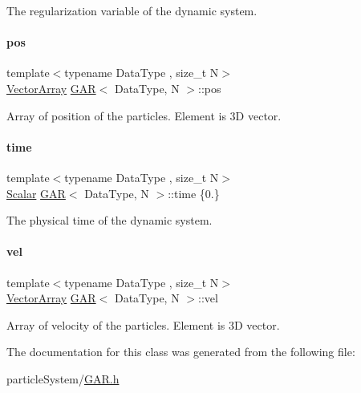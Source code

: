 The regularization variable of the dynamic system. 

\mbox{\label{class_g_a_r_aec6b3fdb2c4dd7bdae27c0b41fbf6dda}} 
\paragraph{\texorpdfstring{pos}{pos}}
{\footnotesize\ttfamily template$<$typename Data\+Type , size\+\_\+t N$>$ \\
\mbox{\hyperlink{class_g_a_r_a5818e17eb203504af6e10f38fc38d378}{Vector\+Array}} \mbox{\hyperlink{class_g_a_r}{G\+AR}}$<$ Data\+Type, N $>$\+::pos}



Array of position of the particles. Element is 3D vector. 

\mbox{\label{class_g_a_r_afaec5fb6242a3e5ae5cd368832cd1bb8}} 
\paragraph{\texorpdfstring{time}{time}}
{\footnotesize\ttfamily template$<$typename Data\+Type , size\+\_\+t N$>$ \\
\mbox{\hyperlink{class_g_a_r_a2ae44eda8e28d5dd26cf707dcda69314}{Scalar}} \mbox{\hyperlink{class_g_a_r}{G\+AR}}$<$ Data\+Type, N $>$\+::time \{0.\}}



The physical time of the dynamic system. 

\mbox{\label{class_g_a_r_a9619f6250eb37cb006bd508591f01997}} 
\paragraph{\texorpdfstring{vel}{vel}}
{\footnotesize\ttfamily template$<$typename Data\+Type , size\+\_\+t N$>$ \\
\mbox{\hyperlink{class_g_a_r_a5818e17eb203504af6e10f38fc38d378}{Vector\+Array}} \mbox{\hyperlink{class_g_a_r}{G\+AR}}$<$ Data\+Type, N $>$\+::vel}



Array of velocity of the particles. Element is 3D vector. 



The documentation for this class was generated from the following file\+:\begin{DoxyCompactItemize}
\item 
particle\+System/\mbox{\hyperlink{_g_a_r_8h}{G\+A\+R.\+h}}\end{DoxyCompactItemize}
